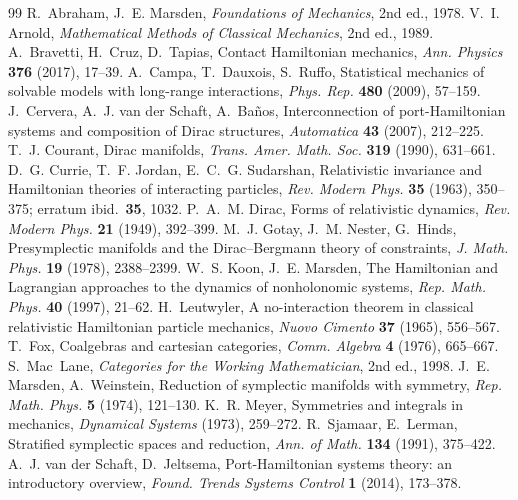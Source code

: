 \documentclass[12pt,a4paper]{article}
\theoremstyle{definition}
\theoremstyle{plain}
\theoremstyle{commentary}
\begin{document}
\begin{thebibliography}{99}
\small
{} R.~Abraham, J.~E. Marsden, \emph{Foundations of Mechanics}, 2nd ed., 1978.
 V.~I. Arnold, \emph{Mathematical Methods of Classical Mechanics}, 2nd ed., 1989.
 A.~Bravetti, H.~Cruz, D.~Tapias, Contact Hamiltonian mechanics, \emph{Ann. Physics} \textbf{376} (2017), 17--39.
 A.~Campa, T.~Dauxois, S.~Ruffo, Statistical mechanics of solvable models with long-range interactions, \emph{Phys. Rep.} \textbf{480} (2009), 57--159.
 J.~Cervera, A.~J. van der Schaft, A.~Ba\~nos, Interconnection of port-Hamiltonian systems and composition of Dirac structures, \emph{Automatica} \textbf{43} (2007), 212--225.
 T.~J. Courant, Dirac manifolds, \emph{Trans. Amer. Math. Soc.} \textbf{319} (1990), 631--661.
 D.~G. Currie, T.~F. Jordan, E.~C.~G. Sudarshan, Relativistic invariance and Hamiltonian theories of interacting particles, \emph{Rev. Modern Phys.} \textbf{35} (1963), 350--375; erratum ibid.\ \textbf{35}, 1032.
 P.~A.~M. Dirac, Forms of relativistic dynamics, \emph{Rev. Modern Phys.} \textbf{21} (1949), 392--399.
 M.~J. Gotay, J.~M. Nester, G.~Hinds, Presymplectic manifolds and the Dirac--Bergmann theory of constraints, \emph{J. Math. Phys.} \textbf{19} (1978), 2388--2399.
 W.~S. Koon, J.~E. Marsden, The Hamiltonian and Lagrangian approaches to the dynamics of nonholonomic systems, \emph{Rep. Math. Phys.} \textbf{40} (1997), 21--62.
 H.~Leutwyler, A no-interaction theorem in classical relativistic Hamiltonian particle mechanics, \emph{Nuovo Cimento} \textbf{37} (1965), 556--567.
 T.~Fox, Coalgebras and cartesian categories, \emph{Comm. Algebra} \textbf{4} (1976), 665--667.
 S.~Mac~Lane, \emph{Categories for the Working Mathematician}, 2nd ed., 1998.
 J.~E. Marsden, A.~Weinstein, Reduction of symplectic manifolds with symmetry, \emph{Rep. Math. Phys.} \textbf{5} (1974), 121--130.
 K.~R. Meyer, Symmetries and integrals in mechanics, \emph{Dynamical Systems} (1973), 259--272.
 R.~Sjamaar, E.~Lerman, Stratified symplectic spaces and reduction, \emph{Ann. of Math.} \textbf{134} (1991), 375--422.
 A.~J. van der Schaft, D.~Jeltsema, Port-Hamiltonian systems theory: an introductory overview, \emph{Found. Trends Systems Control} \textbf{1} (2014), 173--378.

\end{thebibliography}
\end{document}
